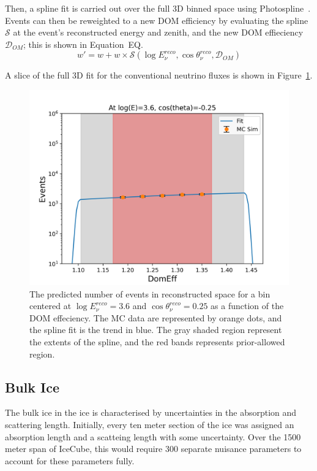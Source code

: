 \documentclass[main.tex]{subfiles}
\begin{document}
Then, a spline fit is carried out over the full 3D binned space using Photospline~\cite{WHITEHORN20132214}. 
Events can then be reweighted to a new DOM efficiency by evaluating the spline $\mathcal{S}$ at the event's reconstructed energy and zenith, and the new DOM effieciency $\mathcal{D}_{OM}$; this is shown in Equation~EQ.
\begin{equation}\label{eq:domeff}
    w' = w + w\times \mathcal{S}(\log E_{\nu}^{reco}, \cos\theta_{\nu}^{reco}, \mathcal{D}_{OM})
\end{equation}

A slice of the full 3D fit for the conventional neutrino fluxes is shown in Figure~\ref{fig:domeff_fit}.
\begin{figure}
    \centering
    \includegraphics[width=0.8\linewidth]{figures/atmConv_logE_3.6_cosz_-0.25.png}
    \caption{The predicted number of events in reconstructed space for a bin centered at $\log E_{\nu}^{reco}=3.6$ and $\cos\theta_{\nu}^{reco}=0.25$ as a function of the DOM effeciency. The MC data are represented by orange dots, and the spline fit is the trend in blue. The gray shaded region represent the extents of the spline, and the red bands represents prior-allowed region.}\label{fig:domeff_fit}
\end{figure}


\subsection{Bulk Ice}

The bulk ice in the ice is characterised by uncertainties in the absorption and scattering length. 
Initially, every ten meter section of the ice was assigned an absorption length and a scatteing length with some uncertainty. 
Over the 1500 meter span of IceCube, this would require 300 separate nuisance parameters to account for these parameters fully.
\end{document}
